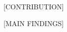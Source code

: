 \documentclass[12pt, a4paper]{article}
\begin{document}



[CONTRIBUTION]



[MAIN FINDINGS]


\end{document}

